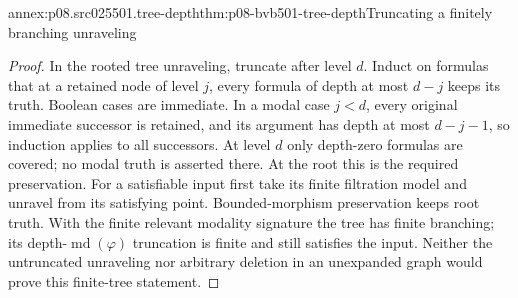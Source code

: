 \begin{annexitem}{annex:p08.src025501.tree-depth}{thm:p08-bvb501-tree-depth}{Truncating a finitely branching unraveling}
\begin{proof}
In the rooted tree unraveling, truncate after level \(d\).
Induct on formulas that at a retained node of level \(j\), every
formula of depth at most \(d-j\) keeps its truth. Boolean cases
are immediate. In a modal case \(j<d\), every original immediate
successor is retained, and its argument has depth at most
\(d-j-1\), so induction applies to all successors. At level
\(d\) only depth-zero formulas are covered; no modal truth is
asserted there. At the root this is the required preservation.
For a satisfiable input first take its finite filtration model and
unravel from its satisfying point. Bounded-morphism preservation keeps
root truth. With the finite relevant modality signature the tree has
finite branching; its depth-\(\operatorname{md}(\varphi)\)
truncation is finite and still satisfies the input. Neither the untruncated
unraveling nor arbitrary deletion in an unexpanded graph would prove
this finite-tree statement.
\end{proof}
\end{annexitem}

